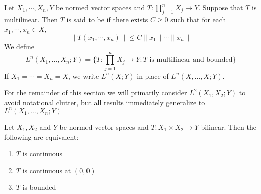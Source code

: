 \documentclass{book}
\begin{document}
	\begin{defn} 
		Let $X_1, \cdots, X_n, Y$ be normed vector spaces and $T : \prod\limits_{j=1}^n X_j \rightarrow Y$. Suppose that $T$ is multilinear. Then $T$ is said to be  if there exists $C \geq 0$ such that for each $x_1, \cdots, x_n \in X$, $$\|T(x_1, \cdots, x_n)\| \leq C \|x_1\| \cdots \|x_n\|$$
		We define $$L^n (X_1, \dots, X_n; Y) = \bigg\{T : \prod\limits_{j=1}^n X_j \rightarrow Y: T \text{ is multilinear and bounded}\bigg \}$$ 
		If $X_1 = \cdots = X_n = X$, we write $L^n(X;Y)$ in place of $L^n (X, \dots, X; Y) $. 
	\end{defn}
	
	\begin{note}
	For the remainder of this section we will primarily consider $L^2(X_1, X_2; Y)$ to avoid notational clutter, but all results immediately generalize to $L^n(X_1, \ldots, X_n;Y)$
	\end{note}
	
	\begin{ex} 
	Let $X_1, X_2$ and $Y$ be normed vector spaces and $T: X_1 \times X_2 \rightarrow Y$ bilinear. Then the following are equivalent:
	\begin{enumerate}
			\item $T$ is continuous
			\item $T$ is continuous at $(0,0)$
			\item $T$ is bounded
		\end{enumerate}
	\end{ex}
	
\end{document}
